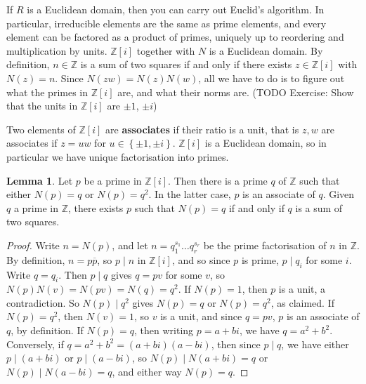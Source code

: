 \documentclass{article}
\newcommand{\Z}{\mathbb{Z}}
\newcommand{\rb}[1]{\left( #1 \right)}
\renewcommand{\sb}[1]{\left[ #1 \right]}
\newcommand{\cb}[1]{\left\{ #1 \right\}}
\theoremstyle{definition}\newtheorem{definition}{Definition}
\theoremstyle{definition}\newtheorem*{remark}{Remark}
\theoremstyle{definition}\newtheorem*{example}{Example}
\theoremstyle{definition}\newtheorem*{note}{Note}
\newtheorem{lemma}[definition]{Lemma}
\begin{document}
If $ R $ is a Euclidean domain, then you can carry out Euclid's algorithm. In particular, irreducible elements are the same as prime elements, and every element can be factored as a product of primes, uniquely up to reordering and multiplication by units. $ \Z\sb{i} $ together with $ N $ is a Euclidean domain. By definition, $ n \in \Z $ is a sum of two squares if and only if there exists $ z \in \Z\sb{i} $ with $ N\rb{z} = n $. Since $ N\rb{zw} = N\rb{z}N\rb{w} $, all we have to do is to figure out what the primes in $ \Z\sb{i} $ are, and what their norms are. (TODO Exercise: Show that the units in $ \Z\sb{i} $ are $ \pm 1 $, $ \pm i $)


Two elements of $ \Z\sb{i} $ are \textbf{associates} if their ratio is a unit, that is $ z, w $ are associates if $ z = uw $ for $ u \in \cb{\pm 1, \pm i} $. $ \Z\sb{i} $ is a Euclidean domain, so in particular we have unique factorisation into primes.

\begin{lemma}
Let $ p $ be a prime in $ \Z\sb{i} $. Then there is a prime $ q $ of $ \Z $ such that either $ N\rb{p} = q $ or $ N\rb{p} = q^2 $. In the latter case, $ p $ is an associate of $ q $. Given $ q $ a prime in $ \Z $, there exists $ p $ such that $ N\rb{p} = q $ if and only if $ q $ is a sum of two squares.
\end{lemma}

\begin{proof}
Write $ n = N\rb{p} $, and let $ n = q_1^{s_1} \dots q_r^{s_r} $ be the prime factorisation of $ n $ in $ \Z $. By definition, $ n = p\overline{p} $, so $ p \mid n $ in $ \Z\sb{i} $, and so since $ p $ is prime, $ p \mid q_i $ for some $ i $. Write $ q = q_i $. Then $ p \mid q $ gives $ q = pv $ for some $ v $, so $ N\rb{p}N\rb{v} = N\rb{pv} = N\rb{q} = q^2 $. If $ N\rb{p} = 1 $, then $ p $ is a unit, a contradiction. So $ N\rb{p} \mid q^2 $ gives $ N\rb{p} = q $ or $ N\rb{p} = q^2 $, as claimed. If $ N\rb{p} = q^2 $, then $ N\rb{v} = 1 $, so $ v $ is a unit, and since $ q = pv $, $ p $ is an associate of $ q $, by definition. If $ N\rb{p} = q $, then writing $ p = a + bi $, we have $ q = a^2 + b^2 $. Conversely, if $ q = a^2 + b^2 = \rb{a + bi}\rb{a - bi} $, then since $ p \mid q $, we have either $ p \mid \rb{a + bi} $ or $ p \mid \rb{a - bi} $, so $ N\rb{p} \mid N\rb{a + bi} = q $ or $ N\rb{p} \mid N\rb{a - bi} = q $, and either way $ N\rb{p} = q $.
\end{proof}
\end{document}
